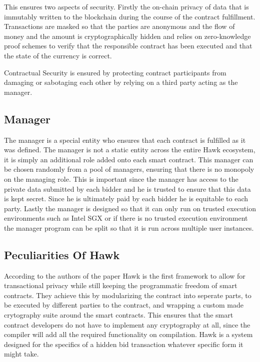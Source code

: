 This ensures two aspects of security. Firstly the on-chain privacy of data that is immutably written to the blockchain during the course of the contract fulfillment. Transactions are masked so that the parties are anonymous and the flow of money and the amount is cryptographically hidden and relies on zero-knowledge proof schemes to verify that the responsible contract has been executed and that the state of the currency is correct.

Contractual Security is ensured by protecting contract participants from damaging or sabotaging each other by relying on a third party acting as the manager.

\subsection{Manager}
The manager is a special entity who ensures that each contract is fulfilled as it was defined. The manager is not a static entity across the entire Hawk ecosystem, it is simply an additional role added onto each smart contract. This manager can be chosen randomly from a pool of managers, ensuring that there is no monopoly on the managing role. This is important since the manager has access to the private data submitted by each bidder and he is trusted to ensure that this data is kept secret. Since he is ultimately paid by each bidder he is equitable to each party. Lastly the manager is designed so that it can only run on trusted execution environments such as Intel SGX or if there is no trusted execution environment the manager program can be split so that it is run across multiple user instances.\cite[p.840]{Hawk}

\subsection{Peculiarities Of Hawk}
According to the authors of the paper Hawk is the first framework to allow for transactional privacy while still keeping the programmatic freedom of smart contracts.\cite[p.842-843]{Hawk} They achieve this by modularizing the contract into seperate parts, to be executed by different parties to the contract, and wrapping a custom made crytography suite around the smart contracts. This ensures that the smart contract developers do not have to implement any cryptography at all, since the compiler will add all the required functionality on compilation. Hawk is a system designed for the specifics of a hidden bid transaction whatever specific form it might take.\cite[p.839]{Hawk}

